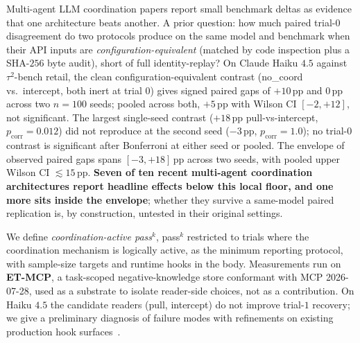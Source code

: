 
Multi-agent LLM coordination papers report small
benchmark deltas as evidence that one architecture beats
another. A prior question: how much paired
trial-$0$ disagreement do two protocols produce on the same
model and benchmark when their API inputs are
\emph{configuration-equivalent} (matched by code inspection
plus a SHA-$256$ byte audit), short of full
identity-replay? On Claude Haiku $4.5$ against
$\tau^2$-bench retail, the clean configuration-equivalent
contrast (no\_coord vs.\ intercept, both inert at trial $0$)
gives signed paired gaps of $+10$\,pp and $0$\,pp across two
$n{=}100$ seeds; pooled across both, $+5$\,pp with Wilson CI
$[{-}2,{+}12]$, not significant. The largest single-seed
contrast ($+18$\,pp pull-vs-intercept, $p_{\text{corr}}{=}0.012$)
did not reproduce at the second seed ($-3$\,pp,
$p_{\text{corr}}{=}1.0$); no trial-$0$ contrast is
significant after Bonferroni at either seed or pooled. The envelope of
observed paired gaps spans $[{-}3,{+}18]$\,pp across two seeds,
with pooled upper Wilson CI $\lesssim 15$\,pp.
\textbf{Seven of ten recent multi-agent coordination
architectures report headline effects below this local floor,
and one more sits inside the envelope}; whether they survive a same-model paired
replication is, by construction, untested in their original
settings.

We define \emph{coordination-active pass$^k$}, pass$^k$
restricted to trials where the coordination mechanism is
logically active, as the minimum reporting protocol, with
sample-size targets and runtime hooks in the body. Measurements run on \textbf{ET-MCP}, a
task-scoped negative-knowledge store conformant with MCP
2026-07-28, used as a substrate to isolate reader-side
choices, not as a contribution. On Haiku $4.5$ the
candidate readers (pull, intercept) do not improve
trial-$1$ recovery; we give a preliminary diagnosis of
failure modes with refinements on existing production hook
surfaces~\cite{strandshooks2025,agentcorepolicy2025,langchainmiddleware2026,sagemaker_monitor2022}.

